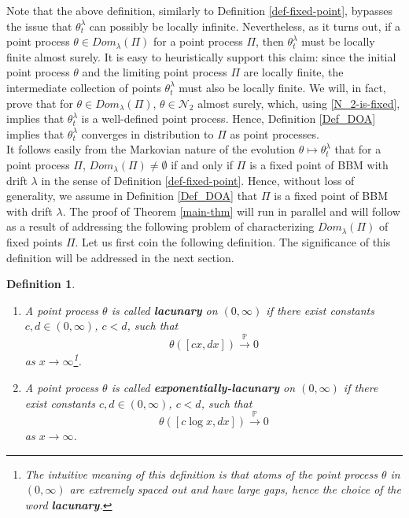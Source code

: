 \documentclass[a4paper,reqno]{amsart}%
\newcommand{\1}{\mathbf 1}
\theoremstyle{mine}
\numberwithin{theorem}{section}
\newtheorem{definition}[theorem]{Definition}
\numberwithin{equation}{section}
\theoremstyle{remark}
\begin{document}
Note that the above definition, similarly to Definition \ref{def-fixed-point}, bypasses the issue that $\theta_t^\lambda$ can possibly be locally infinite. Nevertheless, as it turns out, if a point process $\theta \in Dom_{\lambda}(\Pi)$ for a point process $\Pi$, then $\theta_t^\lambda$ must be locally finite almost surely. It is easy to heuristically support this claim: since the initial point process $\theta$ and the limiting point process $\Pi$ are locally finite, the intermediate collection of points $\theta_t^\lambda$ must also be locally finite. We will, in fact, prove that for $\theta \in Dom_{\lambda}(\Pi)$, $\theta \in \mathcal{N}_2$ almost surely, which, using \eqref{N_2-is-fixed}, implies that $\theta_t^\lambda$ is a well-defined point process. Hence, Definition \ref{Def_DOA} implies that $\theta_t^\lambda$ converges in distribution to $\Pi$ as point processes. \\

It follows easily from the Markovian nature of the evolution $\theta \mapsto \theta_t^\lambda$ that for a point process $\Pi$, $Dom_{\lambda}(\Pi) \neq \emptyset$ if and only if  $\Pi$ is a fixed point of BBM with drift $\lambda$ in the sense of Definition \ref{def-fixed-point}. Hence, without loss of generality, we assume in Definition \ref{Def_DOA} that $\Pi$ is a fixed point of BBM with drift $\lambda$. The proof of Theorem \ref{main-thm} will run in parallel and will follow as a result of addressing the following problem of characterizing $Dom_{\lambda}(\Pi)$ of fixed points $\Pi$. Let us first coin the following definition. The significance of this definition will be addressed in the next section. 


\begin{definition}\label{def-lacunary}
\begin{enumerate}
    \item A point process $\theta$ is called \textbf{lacunary} on $(0,\infty)$ if there exist constants $c,d \in (0, \infty)$, $c<d$, such that  
    \begin{equation} \label{lacunary-1}
        \theta([cx, d x ]) \overset{\mathbb{P}}{\rightarrow} 0
    \end{equation} 
    as $x \rightarrow \infty $\footnote{The intuitive meaning of this definition is that atoms of the point process $\theta$ in $(0,\infty)$ are extremely spaced out and have large gaps, hence the choice of the word \textbf{lacunary}.}. 

    \item A point process $\theta$ is called \textbf{exponentially-lacunary} on $(0,\infty)$ if there exist constants $c,d \in (0, \infty)$, $c<d$, such that 
    \begin{equation}\label{lacunary-2}
         \theta([c \log x, d x ]) \overset{\mathbb{P}}{\rightarrow} 0
    \end{equation}
    as $x \rightarrow \infty $. 
\end{enumerate}
\end{definition}
\end{document}
